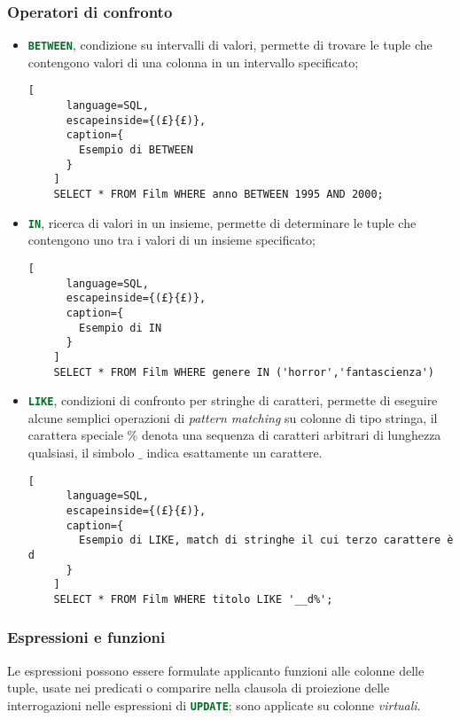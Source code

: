 \subsubsection{Operatori di confronto}%
\label{ssub:Operatori di confronto}
\begin{itemize}
  \item \lstinline[language=SQL]{BETWEEN}, condizione su intervalli di valori,
    permette di trovare le tuple che contengono valori di una colonna in un
    intervallo specificato;
    \begin{lstlisting}[
      language=SQL,
      escapeinside={(£}{£)},
      caption={
        Esempio di BETWEEN
      }
    ]
    SELECT * FROM Film WHERE anno BETWEEN 1995 AND 2000;
    \end{lstlisting}
    
  \item \lstinline[language=SQL]{IN}, ricerca di valori in un insieme, permette
    di determinare le tuple che contengono uno tra i valori di un insieme
    specificato;
    \begin{lstlisting}[
      language=SQL,
      escapeinside={(£}{£)},
      caption={
        Esempio di IN
      }
    ]
    SELECT * FROM Film WHERE genere IN ('horror','fantascienza')
    \end{lstlisting}
    
  \item \lstinline[language=SQL]{LIKE}, condizioni di confronto per stringhe di
    caratteri, permette di eseguire alcune semplici operazioni di \emph{pattern
    matching} su colonne di tipo stringa, il carattera speciale $\%$ denota una
    sequenza di caratteri arbitrari di lunghezza qualsiasi, il simbolo $\_$
    indica esattamente un carattere.
    \begin{lstlisting}[
      language=SQL,
      escapeinside={(£}{£)},
      caption={
        Esempio di LIKE, match di stringhe il cui terzo carattere è d
      }
    ]
    SELECT * FROM Film WHERE titolo LIKE '__d%';
    \end{lstlisting}
\end{itemize}

\subsubsection{Espressioni e funzioni}%
\label{ssub:Espressioni e funzioni}
Le espressioni possono essere formulate applicanto funzioni alle colonne delle
tuple, usate nei predicati o comparire nella clausola di proiezione delle
interrogazioni nelle espressioni di \lstinline[language=SQL]{UPDATE}; sono
applicate su colonne \emph{virtuali}.

